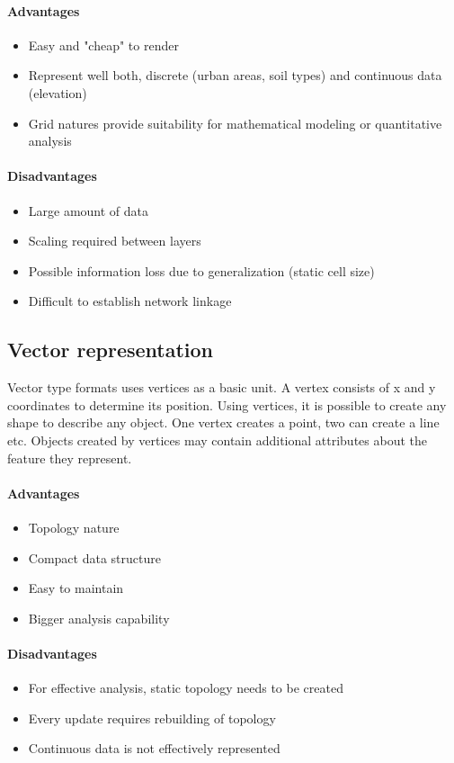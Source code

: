 \documentclass[thesis=M,english]{FITthesis}[2012/10/20]
\begin{document}
\paragraph*{Advantages}
\begin{itemize}[noitemsep]
\item Easy and "cheap" to render
\item Represent well both, discrete (urban areas, soil types) and continuous data (elevation)
\item Grid natures provide suitability for mathematical modeling or quantitative analysis
\end{itemize}

\paragraph*{Disadvantages}
\begin{itemize}[noitemsep]
\item Large amount of data
\item Scaling required between layers
\item Possible information loss due to generalization (static cell size)
\item Difficult to establish network linkage
\end{itemize}

\subsection{Vector representation}
Vector type formats uses vertices as a basic unit. A vertex consists of x and y coordinates to determine its position. Using vertices, it is possible to create any shape to describe any object. One vertex creates a point, two can create a line etc. Objects created by vertices may contain additional attributes about the feature they represent.

\paragraph*{Advantages}
\begin{itemize}[noitemsep]
\item Topology nature
\item Compact data structure
\item Easy to maintain
\item Bigger analysis capability
\end{itemize}

\paragraph*{Disadvantages}
\begin{itemize}[noitemsep]
\item For effective analysis, static topology needs to be created
\item Every update requires rebuilding of topology
\item Continuous data is not effectively represented
\end{itemize}
\end{document}

